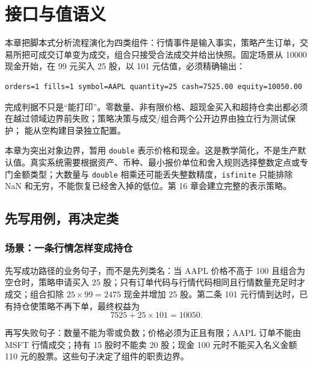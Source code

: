 \chapter{接口与值语义}


本章把脚本式分析流程演化为四类组件：行情事件是输入事实，策略产生订单，交易所把可成交订单变为成交，组合只接受合法成交并给出快照。固定场景从 10000 现金开始，在 99 元买入 25 股，以 101 元估值，必须精确输出：

\begin{lstlisting}
orders=1 fills=1 symbol=AAPL quantity=25 cash=7525.00 equity=10050.00
\end{lstlisting}

完成判据不只是“能打印”。零数量、非有限价格、超现金买入和超持仓卖出都必须在越过领域边界前失败；策略决策与成交/组合两个公开边界由独立行为测试保护； 能从空构建目录独立配置。

\begin{remark}
本章为突出对象边界，暂用 \texttt{double} 表示价格和现金。这是教学简化，不是生产默认值。真实系统需要根据资产、币种、最小报价单位和舍入规则选择整数定点或专门金额类型；大数量与 \texttt{double} 相乘还可能丢失整数精度，\texttt{isfinite} 只能排除 NaN 和无穷，不能恢复已经舍入掉的低位。第 16 章会建立完整的表示策略。
\end{remark}

\section{先写用例，再决定类}

\subsection{场景：一条行情怎样变成持仓}

先写成功路径的业务句子，而不是先列类名：当 AAPL 价格不高于 100 且组合为空仓时，策略申请买入 25 股；只有订单代码与行情代码相同且行情数量充足时才成交；组合扣除 \(25\times99=2475\) 现金并增加 25 股。第二条 101 元行情到达时，已有持仓使策略不再下单，最终权益为
\[
  7525 + 25\times101 = 10050.
\]

再写失败句子：数量不能为零或负数；价格必须为正且有限；AAPL 订单不能由 MSFT 行情成交；持有 15 股时不能卖 20 股；现金 100 元时不能买入名义金额 110 元的股票。这些句子决定了组件的职责边界。

